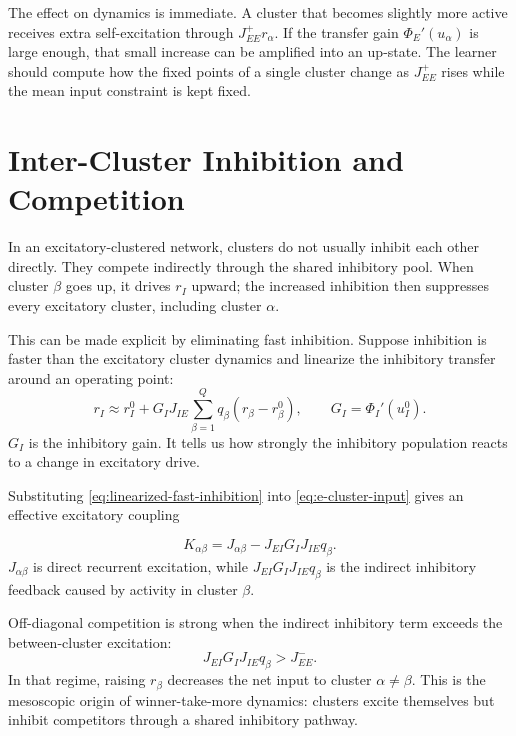 The effect on dynamics is immediate. A cluster that becomes slightly more active receives extra self-excitation through $J_{EE}^{+}r_{\alpha}$. If the transfer gain $\Phi_E'(u_{\alpha})$ is large enough, that small increase can be amplified into an up-state. The learner should compute how the fixed points of a single cluster change as $J_{EE}^{+}$ rises while the mean input constraint is kept fixed.

\section{Inter-Cluster Inhibition and Competition}
\label{sec:inter-cluster-inhibition-competition}

In an excitatory-clustered network, clusters do not usually inhibit each other directly. They compete indirectly through the shared inhibitory pool. When cluster $\beta$ goes up, it drives $r_I$ upward; the increased inhibition then suppresses every excitatory cluster, including cluster $\alpha$.

This can be made explicit by eliminating fast inhibition. Suppose inhibition is faster than the excitatory cluster dynamics and linearize the inhibitory transfer around an operating point:
%
\begin{equation}
  r_I
  \approx
  r_I^0
  +
  G_I J_{IE}
  \sum_{\beta=1}^{Q} q_{\beta}(r_{\beta}-r_{\beta}^0),
  \qquad
  G_I=\Phi_I'(u_I^0).
  \label{eq:linearized-fast-inhibition}
\end{equation}
%
$G_I$ is the inhibitory gain. It tells us how strongly the inhibitory population reacts to a change in excitatory drive.

Substituting \eqref{eq:linearized-fast-inhibition} into \eqref{eq:e-cluster-input} gives an effective excitatory coupling
%
\begin{keyequation}
\begin{equation}
  K_{\alpha\beta}
  =
  J_{\alpha\beta}
  -
  J_{EI}G_I J_{IE}q_{\beta}.
  \label{eq:effective-competition-matrix}
\end{equation}
\tcblower
$J_{\alpha\beta}$ is direct recurrent excitation, while $J_{EI}G_I J_{IE}q_{\beta}$ is the indirect inhibitory feedback caused by activity in cluster $\beta$.
\end{keyequation}

\noindent Off-diagonal competition is strong when the indirect inhibitory term exceeds the between-cluster excitation:
%
\begin{equation}
  J_{EI}G_I J_{IE}q_{\beta} > J_{EE}^{-}.
  \label{eq:competition-condition}
\end{equation}
%
In that regime, raising $r_{\beta}$ decreases the net input to cluster $\alpha\ne\beta$. This is the mesoscopic origin of winner-take-more dynamics: clusters excite themselves but inhibit competitors through a shared inhibitory pathway.

